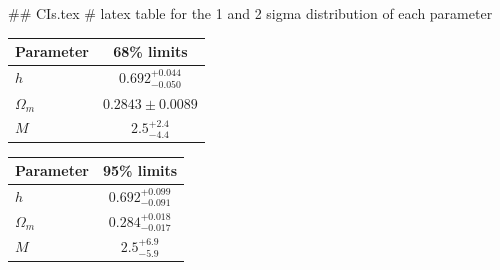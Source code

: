 ## CIs.tex
# latex table for the 1 and 2 sigma distribution of each parameter

\begin{tabular} { l  c}
 Parameter &  68\% limits\\
\hline
{\boldmath$h              $} & $0.692^{+0.044}_{-0.050}   $\\
{\boldmath$\Omega_m       $} & $0.2843\pm 0.0089          $\\
{\boldmath$M              $} & $2.5^{+2.4}_{-4.4}         $\\
\hline
\end{tabular}

\begin{tabular} { l  c}
 Parameter &  95\% limits\\
\hline
{\boldmath$h              $} & $0.692^{+0.099}_{-0.091}   $\\
{\boldmath$\Omega_m       $} & $0.284^{+0.018}_{-0.017}   $\\
{\boldmath$M              $} & $2.5^{+6.9}_{-5.9}         $\\
\hline
\end{tabular}
